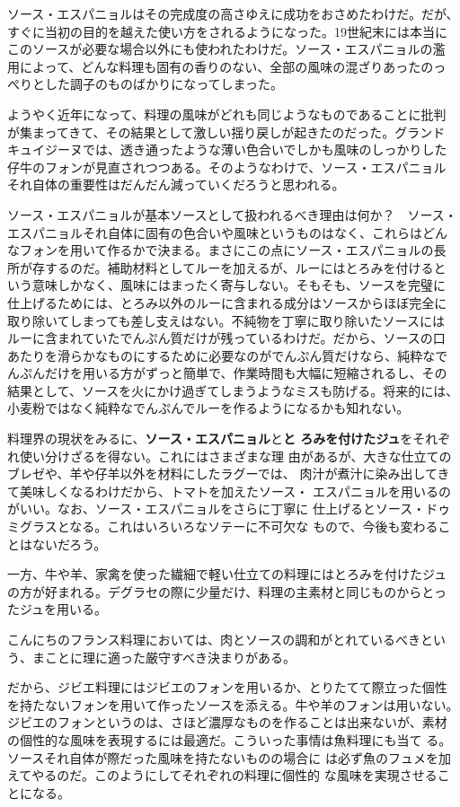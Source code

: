 \documentclass[twoside,12Q,b5j]{escoffierltjsbook}
\begin{document}
ソース・エスパニョルはその完成度の高さゆえに成功をおさめたわけだ。だが、
すぐに当初の目的を越えた使い方をされるようになった。19世紀末には本当に
このソースが必要な場合以外にも使われたわけだ。ソース・エスパニョルの濫
用によって、どんな料理も固有の香りのない、全部の風味の混ざりあったのっ
ぺりとした調子のものばかりになってしまった。

ようやく近年になって、料理の風味がどれも同じようなものであることに批判
が集まってきて、その結果として激しい揺り戻しが起きたのだった。グランド
キュイジーヌでは、透き通ったような薄い色合いでしかも風味のしっかりした
仔牛のフォンが見直されつつある。そのようなわけで、ソース・エスパニョル
それ自体の重要性はだんだん減っていくだろうと思われる。

ソース・エスパニョルが基本ソースとして扱われるべき理由は何か？　ソース・
エスパニョルそれ自体に固有の色合いや風味というものはなく、これらはどん
なフォンを用いて作るかで決まる。まさにこの点にソース・エスパニョルの長
所が存するのだ。補助材料としてルーを加えるが、ルーにはとろみを付けると
いう意味しかなく、風味にはまったく寄与しない。そもそも、ソースを完璧に
仕上げるためには、とろみ以外のルーに含まれる成分はソースからほぼ完全に
取り除いてしまっても差し支えはない。不純物を丁寧に取り除いたソースには
ルーに含まれていたでんぷん質だけが残っているわけだ。だから、ソースの口
あたりを滑らかなものにするために必要なのがでんぷん質だけなら、純粋なで
んぷんだけを用いる方がずっと簡単で、作業時間も大幅に短縮されるし、その
結果として、ソースを火にかけ過ぎてしまうようなミスも防げる。将来的には、
小麦粉ではなく純粋なでんぷんでルーを作るようになるかも知れない。

料理界の現状をみるに、\textbf{ソース・エスパニョル}と\textbf{と
ろみを付けたジュ}をそれぞれ使い分けざるを得ない。これにはさまざまな理
由があるが、大きな仕立てのブレゼや、羊や仔羊以外を材料にしたラグーでは、
肉汁が煮汁に染み出してきて美味しくなるわけだから、トマトを加えたソース・
エスパニョルを用いるのがいい。なお、ソース・エスパニョルをさらに丁寧に
仕上げるとソース・ドゥミグラスとなる。これはいろいろなソテーに不可欠な
もので、今後も変わることはないだろう。

一方、牛や羊、家禽を使った繊細で軽い仕立ての料理にはとろみを付けたジュ
の方が好まれる。デグラセの際に少量だけ、料理の主素材と同じものからとっ
たジュを用いる。

こんにちのフランス料理においては、肉とソースの調和がとれているべきとい
う、まことに理に適った厳守すべき決まりがある。

だから、ジビエ料理にはジビエのフォンを用いるか、とりたてて際立った個性
を持たないフォンを用いて作ったソースを添える。牛や羊のフォンは用いない。
ジビエのフォンというのは、さほど濃厚なものを作ることは出来ないが、素材
の個性的な風味を表現するには最適だ。こういった事情は魚料理にも当て
る。ソースそれ自体が際だった風味を持たないものの場合に
は必ず魚のフュメを加えてやるのだ。このようにしてそれぞれの料理に個性的
な風味を実現させることになる。
\end{document}
